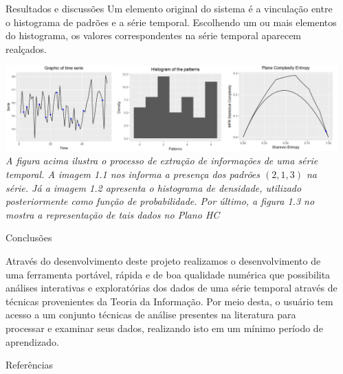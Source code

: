 \documentclass[final]{beamer}
\newlength{\sepmargin}
\newlength{\onecolwid}
\begin{document}
\begin{frame}[t]
\begin{columns}[t]
\begin{column}{\onecolwid}
\begin{block}{Resultados e discussões}
Um elemento original do sistema é a vinculação entre o histograma de padrões e a série temporal. Escolhendo um ou mais elementos do histograma, os valores correspondentes na série temporal aparecem realçados.

\begin{center}\vspace{1cm}
\includegraphics[width=1\linewidth]{img1}
\vspace*{1cm}
\textit{\footnotesize A figura acima ilustra o processo de extração de informações de uma série temporal. A imagem 1.1 nos informa a presença dos padrões $(2,1,3)$ na série. Já a imagem 1.2 apresenta o histograma de densidade, utilizado posteriormente como função de probabilidade. Por último, a figura 1.3 no mostra a representação de tais dados no Plano HC}
\end{center}\vspace{1cm}
\end{block}
               
\begin{block}{Conclusões}
\small

\quad Através do desenvolvimento deste projeto realizamos o desenvolvimento de uma ferramenta portável, rápida e de boa qualidade numérica que possibilita análises interativas e exploratórias dos dados de uma série temporal através de técnicas provenientes da Teoria da Informação.
Por meio desta, o usuário tem acesso a um conjunto técnicas de análise presentes na literatura para processar e examinar seus dados, realizando isto em um mínimo período de aprendizado.

\end{block} 
 
\begin{block}{Referências}
\footnotesize

 
 
\end{block}
 
\end{column}
\begin{column}{\sepmargin} \end{column}
\end{columns} 
\end{frame} 
	
\end{document}
